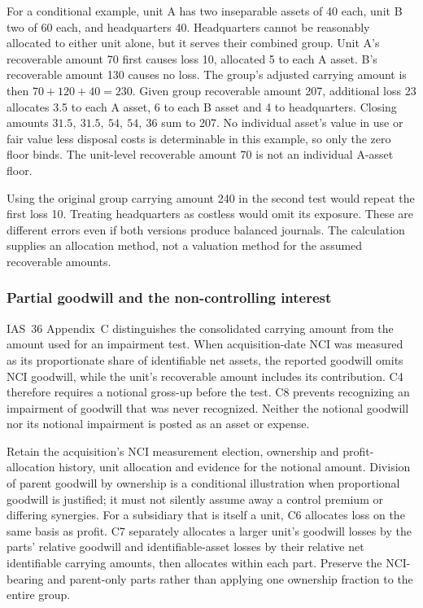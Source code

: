 For a conditional example, unit A has two inseparable assets of 40 each, unit B two of 60 each, and headquarters 40. Headquarters cannot be reasonably allocated to either unit alone, but it serves their combined group. Unit A's recoverable amount 70 first causes loss 10, allocated 5 to each A asset. B's recoverable amount 130 causes no loss. The group's adjusted carrying amount is then \(70 + 120 + 40 = 230\). Given group recoverable amount 207, additional loss 23 allocates 3.5 to each A asset, 6 to each B asset and 4 to headquarters. Closing amounts \(31.5,\ 31.5,\ 54,\ 54,\ 36\) sum to 207. No individual asset's value in use or fair value less disposal costs is determinable in this example, so only the zero floor binds. The unit-level recoverable amount 70 is not an individual A-asset floor.

Using the original group carrying amount 240 in the second test would repeat the first loss 10. Treating headquarters as costless would omit its exposure. These are different errors even if both versions produce balanced journals. The calculation supplies an allocation method, not a valuation method for the assumed recoverable amounts.

\hypertarget{partial-goodwill-and-the-non-controlling-interest}{%
\subsubsection{Partial goodwill and the non-controlling interest}\label{partial-goodwill-and-the-non-controlling-interest}}

IAS~36 Appendix~C \citep[IAS~36.C1--C9]{eu20231803} distinguishes the consolidated carrying amount from the amount used for an impairment test. When acquisition-date NCI was measured as its proportionate share of identifiable net assets, the reported goodwill omits NCI goodwill, while the unit's recoverable amount includes its contribution. C4 therefore requires a notional gross-up before the test. C8 prevents recognizing an impairment of goodwill that was never recognized. Neither the notional goodwill nor its notional impairment is posted as an asset or expense.

Retain the acquisition's NCI measurement election, ownership and profit-allocation history, unit allocation and evidence for the notional amount. Division of parent goodwill by ownership is a conditional illustration when proportional goodwill is justified; it must not silently assume away a control premium or differing synergies. For a subsidiary that is itself a unit, C6 allocates loss on the same basis as profit. C7 separately allocates a larger unit's goodwill losses by the parts' relative goodwill and identifiable-asset losses by their relative net identifiable carrying amounts, then allocates within each part. Preserve the NCI-bearing and parent-only parts rather than applying one ownership fraction to the entire group.

